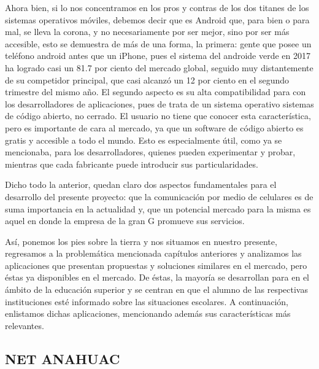 \noindent
Ahora bien, si lo nos concentramos en los pros y contras de los dos titanes de los sistemas operativos móviles, debemos decir que es Android que, para bien o para mal, se lleva la corona, y no necesariamente por ser mejor, sino por ser más accesible, esto se demuestra de más de una forma, la primera: gente que posee un teléfono android antes que un iPhone, pues el sistema del androide verde en 2017 ha logrado casi un 81.7 por ciento del mercado global, seguido muy distantemente de su competidor principal, que casi alcanzó un 12 por ciento en el segundo trimestre del mismo año.		
El segundo aspecto es su alta compatibilidad para con los desarrolladores de aplicaciones, pues de trata de un sistema operativo sistemas de código abierto, no cerrado. El usuario no tiene que conocer esta característica, pero es importante de cara al 
mercado, ya que un software de código abierto es gratis y accesible a todo el mundo. Esto es especialmente útil, como ya se mencionaba, para los desarrolladores, quienes pueden experimentar y probar, mientras que cada fabricante puede introducir sus particularidades. \cite{IDC}

\noindent
\newline
Dicho todo la anterior, quedan claro dos aspectos fundamentales para el desarrollo del presente proyecto: que la comunicación por medio de celulares es de suma importancia en la actualidad y, que un potencial mercado para la misma es aquel en donde la empresa de la gran G promueve sus servicios.

\noindent
Así, ponemos los pies sobre la tierra y nos situamos en nuestro presente, regresamos a la problemática mencionada capítulos anteriores y analizamos las aplicaciones que presentan propuestas y soluciones similares en el mercado, pero éstas ya disponibles en el mercado.
De éstas, la mayoría se desarrollan para en el ámbito de la educación superior y se centran en que el alumno de las respectivas instituciones esté informado sobre las situaciones escolares.
A continuación, enlistamos dichas aplicaciones, mencionando además sus características más relevantes.

\pagebreak
\subsection{NET ANAHUAC}

